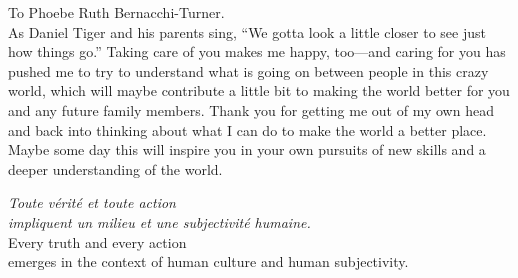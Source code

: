 \documentclass[12pt,chapterheads]{UCMerced}
\begin{document}
\begin{frontmatter}
\makefrontmatter %

%
%


\begin{dedication} %
  To Phoebe Ruth Bernacchi-Turner.  \\[2em]
  As Daniel Tiger and his parents sing, ``We gotta look a little 
  closer to see just how things go.'' Taking care of you makes me happy, 
  too---and caring for you has pushed me to try to 
  understand what is going on between people 
  in this crazy world, which
  will maybe contribute a little bit to making the world better for you and
  any future family members. Thank you for getting me out of my own
  head and back into thinking about what I can do to make the world a better
  place. Maybe some day this will inspire you in your own pursuits of new skills and
  a deeper understanding of the world.
\end{dedication}

%   
% 



\begin{epigraph} %
  \emph{Toute v\'{e}rit\'{e} et toute action \\
  impliquent un milieu et une subjectivit\'{e} humaine.}\\[2em]
  Every truth and every action \\
  emerges in the context of human culture and human subjectivity.\\[2em]


\end{epigraph}
\end{frontmatter}
\end{document}
